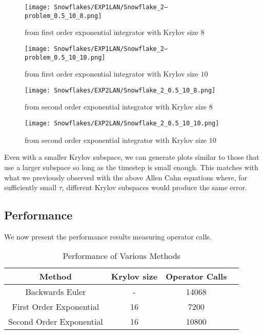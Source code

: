\begin{figure}[H]
    \centering
    \begin{minipage}{0.49\textwidth}
        \texttt{[image: Snowflakes/EXP1LAN/Snowflake\_2--problem\_0.5\_10\_8.png]} %
        \caption{from first order exponential integrator with Krylov size $8$}
        \label{fig:first order 8 0.5}
    \end{minipage}\hfill
    \centering
    \begin{minipage}{0.49\textwidth}
        \texttt{[image: Snowflakes/EXP1LAN/Snowflake\_2--problem\_0.5\_10\_10.png]} %
        \caption{from first order exponential integrator with Krylov size $10$}
        \label{fig:first order 10 0.5}
    \end{minipage}\hfill
\end{figure}
\begin{figure}[H]
    \centering
    \begin{minipage}{0.49\textwidth}
        \texttt{[image: Snowflakes/EXP2LAN/Snowflake\_2\_0.5\_10\_8.png]} %
        \caption{from second order exponential integrator with Krylov size $8$}
        \label{fig:second order 8 0.5}
    \end{minipage}\hfill
    \centering
    \begin{minipage}{0.49\textwidth}
        \texttt{[image: Snowflakes/EXP2LAN/Snowflake\_2\_0.5\_10\_10.png]} %
        \caption{from second order exponential integrator with Krylov size $10$}
        \label{fig:second order 10 0.5}
    \end{minipage}\hfill
\end{figure}

Even with a smaller Krylov subspace, we can generate plots similar to those that use a larger subspace so long as the timestep is small enough.
This matches with what we previously observed with the above Allen Cahn equations where, for sufficiently small $\tau$, different Krylov subspaces would produce the same error.

\subsection{Performance}
We now present the performance results measuring operator calls.
\begin{table}[H]
    \centering
    \begin{tabular}{| c | c | c | c |}
    \hline
    Method & Krylov size & Operator Calls\\
    \hline
    Backwards Euler & - & 14068 \\
    First Order Exponential & 16 & 7200 \\
    Second Order Exponential & 16 & 10800 \\
    \hline
    \end{tabular}
    \caption{Performance of Various Methods}
    \label{tab:reduced_data}
\end{table}

